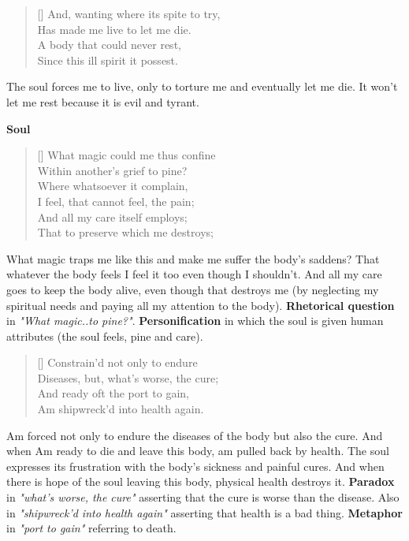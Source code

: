 \begin{verse}[\versewidth]
{\fontverse
And, wanting where its spite to try,\\
Has made me live to let me die.\\
A body that could never rest,\\
Since this ill spirit it possest. 
} 
\end{verse}

The soul forces me to live, only to torture me and eventually let me die.
It won't let me rest because it is evil and tyrant.\bigbreak

\centerline{\textbf{\large{Soul}}}
\begin{verse}[\versewidth]
{\fontverse
What magic could me thus confine\\
Within another’s grief to pine?\\
Where whatsoever it complain,\\
I feel, that cannot feel, the pain;\\
And all my care itself employs;\\
That to preserve which me destroys;
} 
\end{verse}

What magic traps me like this and make me suffer the body's saddens? That
whatever the body feels I feel it too even though I shouldn't. And all my 
care goes to keep the body alive, even though that destroys me (by neglecting 
my spiritual needs and paying all my attention to the body). \textbf{Rhetorical question} in
\textit{"What magic..to pine?"}. \textbf{Personification} in which the soul is given 
human attributes (the soul feels, pine and care). 


\begin{verse}[\versewidth]
{\fontverse
Constrain’d not only to endure\\
Diseases, but, what’s worse, the cure;\\
And ready oft the port to gain,\\
Am shipwreck’d into health again. 
} 
\end{verse}

Am forced not only to endure the diseases of the body but also the cure.
And when Am ready to die and leave this body, am pulled back by health.
The soul expresses its frustration with the body's sickness and painful cures.
And when there is hope of the soul leaving this body, physical health destroys it. 
\textbf{Paradox} in \textit{"what's worse, the cure"} asserting that the cure is worse
than the disease. Also in \textit{"shipwreck’d into health again"} asserting that health
is a bad thing. \textbf{Metaphor} in \textit{"port to gain"} referring to death.\bigbreak

